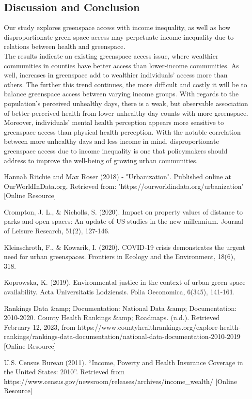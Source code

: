 \documentclass{article}
\begin{document}
\subsection{Discussion and Conclusion}
Our study explores greenspace access with income inequality, as well as how disproportionate green space access may perpetuate income inequality due to relations between health and greenspace. \\

The results indicate an existing greenspace access issue, where wealthier communities in counties have better access than lower-income communities. As well, increases in greenspace add to wealthier individuals’ access more than others. The further this trend continues, the more difficult and costly it will be to balance greenspace access between varying income groups. With regards to the population’s perceived unhealthy days, there is a weak, but observable association of better-perceived health from lower unhealthy day counts with more greenspace. Moreover, individuals’ mental health perception appears more sensitive to greenspace access than physical health perception. With the notable correlation between more unhealthy days and less income in mind, disproportionate greenspace access due to income inequality is one that policymakers should address to improve the well-being of growing urban communities. 


\newpage

\begin{thebibliography}{9}

Hannah Ritchie and Max Roser (2018) - "Urbanization". Published online at OurWorldInData.org. Retrieved from: 'https://ourworldindata.org/urbanization' [Online Resource]

Crompton, J. L., \& Nicholls, S. (2020). Impact on property values of distance to parks and open spaces: An update of US studies in the new millennium. Journal of Leisure Research, 51(2), 127-146.



Kleinschroth, F., \& Kowarik, I. (2020). COVID‐19 crisis demonstrates the urgent need for urban greenspaces. Frontiers in Ecology and the Environment, 18(6), 318. 

Koprowska, K. (2019). Environmental justice in the context of urban green space availability. Acta Universitatis Lodziensis. Folia Oeconomica, 6(345), 141-161.

Rankings Data \&amp; Documentation: National Data \&amp; Documentation: 2010-2020. County Health Rankings \&amp; Roadmaps. (n.d.). Retrieved February 12, 2023, from https://www.countyhealthrankings.org/explore-health-rankings/rankings-data-documentation/national-data-documentation-2010-2019 [Online Resource]

U.S. Census Bureau (2011). “Income, Poverty and Health Insurance Coverage in the United States: 2010”. Retrieved from https://www.census.gov/newsroom/releases/archives/income\_wealth/ [Online Resource]




\end{thebibliography}
\end{document}
